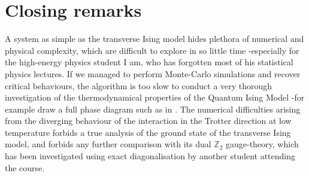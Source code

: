 \documentclass[11pt,openany]{article}
\begin{document}
\section{Closing remarks}

A system as simple as the transverse Ising model hides plethora of numerical and physical complexity, which are difficult to explore in so little time -especially for the high-energy physics student I am, who has forgotten most of his statistical physics lectures. If we managed to perform Monte-Carlo simulations and recover critical behaviours, the algorithm is too slow to conduct a very thorough investigation of the thermodynamical properties of the Quantum Ising Model -for example draw a full phase diagram such as in \cite{Chakrabarti}. The numerical difficulties arising from the diverging behaviour of the interaction in the Trotter direction at low temperature forbids a true analysis of the ground state of the transverse Ising model, and forbids any further comparison with its dual $\mathds{Z}_2$ gauge-theory, which has been investigated using exact diagonalisation by another student attending the course.


\clearpage\printbibliography


%
\end{document}
